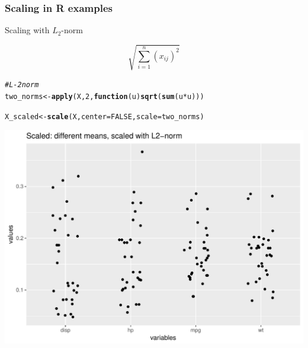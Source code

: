 \documentclass[12pt]{beamer}\usepackage[]{graphicx}\usepackage[]{color}
\makeatletter
\def\maxwidth{ %
  \ifdim\Gin@nat@width>\linewidth
    \linewidth
  \else
    \Gin@nat@width
  \fi
}
\newcommand{\hlnum}[1]{\textcolor[rgb]{0.686,0.059,0.569}{#1}}%
\newcommand{\hlcom}[1]{\textcolor[rgb]{0.678,0.584,0.686}{\textit{#1}}}%
\newcommand{\hlopt}[1]{\textcolor[rgb]{0,0,0}{#1}}%
\newcommand{\hlstd}[1]{\textcolor[rgb]{0.345,0.345,0.345}{#1}}%
\newcommand{\hlkwa}[1]{\textcolor[rgb]{0.161,0.373,0.58}{\textbf{#1}}}%
\newcommand{\hlkwb}[1]{\textcolor[rgb]{0.69,0.353,0.396}{#1}}%
\newcommand{\hlkwc}[1]{\textcolor[rgb]{0.333,0.667,0.333}{#1}}%
\newcommand{\hlkwd}[1]{\textcolor[rgb]{0.737,0.353,0.396}{\textbf{#1}}}%
\newenvironment{kframe}{%
 \def\at@end@of@kframe{}%
 \ifinner\ifhmode%
  \def\at@end@of@kframe{\end{minipage}}%
  \begin{minipage}{\columnwidth}%
 \fi\fi%
 \def\FrameCommand##1{\hskip\@totalleftmargin \hskip-\fboxsep
 \colorbox{shadecolor}{##1}\hskip-\fboxsep
     \hskip-\linewidth \hskip-\@totalleftmargin \hskip\columnwidth}%
 \MakeFramed {\advance\hsize-\width
   \@totalleftmargin\z@ \linewidth\hsize
   \@setminipage}}%
 {\par\unskip\endMakeFramed%
 \at@end@of@kframe}
\newenvironment{knitrout}{}{} %
\makeatother
\begin{document}

\begin{frame}[fragile]
\frametitle{Scaling in R examples}

Scaling with $L_2$-norm

$$
\sqrt{\sum_{i=1}^{n} (x_{ij})^2}
$$

\begin{knitrout}\footnotesize
{}\color{fgcolor}\begin{kframe}
\begin{alltt}
\hlcom{# L-2 norm}
\hlstd{two_norms} \hlkwb{<-} \hlkwd{apply}\hlstd{(X,} \hlnum{2}\hlstd{,} \hlkwa{function}\hlstd{(}\hlkwc{u}\hlstd{)} \hlkwd{sqrt}\hlstd{(}\hlkwd{sum}\hlstd{(u}\hlopt{*}\hlstd{u)))}

\hlstd{X_scaled} \hlkwb{<-} \hlkwd{scale}\hlstd{(X,} \hlkwc{center} \hlstd{=} \hlnum{FALSE}\hlstd{,} \hlkwc{scale} \hlstd{= two_norms)}
\end{alltt}
\end{kframe}
\end{knitrout}

\end{frame}


\begin{frame}[fragile]



\begin{knitrout}\footnotesize
{}\color{fgcolor}

{\centering \includegraphics[width=\maxwidth]{figure/unnamed-chunk-18-1} 

}



\end{knitrout}

\end{frame}
\end{document}
